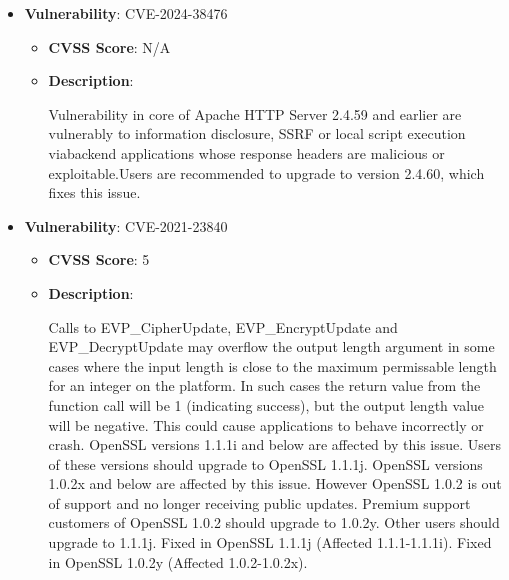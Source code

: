 \documentclass{article}
\begin{document}
\begin{itemize}
        \item \textbf{Vulnerability}: CVE-2024-38476
        \begin{itemize}
            \item \textbf{CVSS Score}:  N/A 
            \item \textbf{Description}:
            \parbox[t]{0.9\linewidth}{
                \ttfamily Vulnerability in core of Apache HTTP Server 2.4.59 and earlier are vulnerably to information disclosure, SSRF or local script execution viabackend applications whose response headers are malicious or exploitable.Users are recommended to upgrade to version 2.4.60, which fixes this issue.
            }
        \end{itemize}
    
        \item \textbf{Vulnerability}: CVE-2021-23840
        \begin{itemize}
            \item \textbf{CVSS Score}:  5 
            \item \textbf{Description}:
            \parbox[t]{0.9\linewidth}{
                \ttfamily Calls to EVP\_CipherUpdate, EVP\_EncryptUpdate and EVP\_DecryptUpdate may overflow the output length argument in some cases where the input length is close to the maximum permissable length for an integer on the platform. In such cases the return value from the function call will be 1 (indicating success), but the output length value will be negative. This could cause applications to behave incorrectly or crash. OpenSSL versions 1.1.1i and below are affected by this issue. Users of these versions should upgrade to OpenSSL 1.1.1j. OpenSSL versions 1.0.2x and below are affected by this issue. However OpenSSL 1.0.2 is out of support and no longer receiving public updates. Premium support customers of OpenSSL 1.0.2 should upgrade to 1.0.2y. Other users should upgrade to 1.1.1j. Fixed in OpenSSL 1.1.1j (Affected 1.1.1-1.1.1i). Fixed in OpenSSL 1.0.2y (Affected 1.0.2-1.0.2x).
            }
        \end{itemize}
    

\end{itemize}
\end{document}
